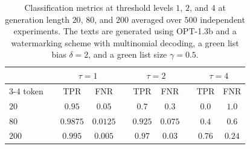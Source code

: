     \begin{table}
        \centering
        \begin{tabular}{l ccc ccc ccc}
            \toprule
            & & \multicolumn{2}{c}{$\tau = 1$} & & \multicolumn{2}{c}{$\tau = 2$} & & \multicolumn{2}{c}{$\tau = 4$} \\ 
            \cmidrule{3-4} \cmidrule{6-7} \cmidrule{9-10}
            token & & TPR & FNR & & TPR & FNR & & TPR & FNR \\
            \midrule
            $20$ & & $0.95$ & $0.05$ & & $0.7$ & $0.3$ & & $0.0$ & $1.0$ \\
            $80$ & & $0.9875$ & $0.0125$ & & $0.925$ & $0.075$ & & $0.4$ & $0.6$ \\
            $200$ & & $0.995$ & $0.005$ & & $0.97$ & $0.03$ & & $0.76$ & $0.24$ \\
            \bottomrule
        \end{tabular}
        \caption[Impact of Threshold Levels on Watermark based Classification]{
            Classification metrics at threshold levels $1$, $2$, and $4$ at generation length $20$, $80$, and $200$ averaged over $500$ independent experiments.
            The texts are generated using OPT-1.3b and a watermarking scheme with multinomial decoding, a green list bias $\delta=2$,  and a green list size $\gamma=0.5$.
        }
        \label{tab:watermarkConfidence} 
    \end{table}

